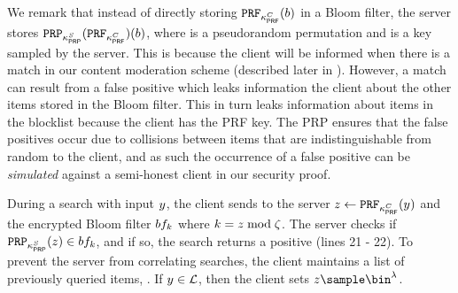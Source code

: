 We remark that instead of directly storing $\prf{\prfKeyClient}(\genericBlocklistElmt)$ in a Bloom filter, the server stores $\prp{\prpKeyServer}(\prf{\prfKeyClient})(\genericBlocklistElmt)$, where \prp is a pseudorandom permutation and \prpKeyServer is a key sampled by the server. This is because the client will be informed when there is a match in our content moderation scheme (described later in ). However, a match can result from a false positive which leaks information the client about the other items stored in the Bloom filter. This in turn leaks information about items in the blocklist because the client has the PRF key. The PRP ensures that the false positives occur due to collisions between items that are indistinguishable from random to the client, and as such the occurrence of a false positive can be \emph{simulated} against a semi-honest client in our security proof. 

During a search with input $\genericCInputElmt$, the client sends to the server $\genericCInputElmtPRFEval \assign \prf{\prfKeyClient}(\genericCInputElmt)$ and the encrypted Bloom filter $\bloomFilter[\bloomFilterIdx]$ where $k = z \bmod \zeta$. The server checks if $\prp{\prpKeyServer}(\genericCInputElmtPRFEval) \in \bloomFilter[\bloomFilterIdx]$, and if so, the search returns a positive (lines 21 - 22). To prevent the server from correlating searches, the client maintains a list of previously queried items, \prevHashList. If $\genericCInputElmt \in \prevHashList$, then the client sets $\genericCInputElmtPRFEval \sample \bin^{\secParam}$. 




